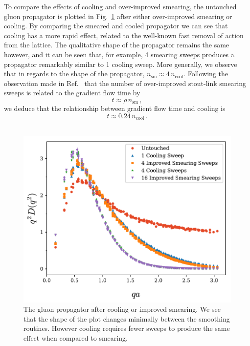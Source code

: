 To compare the effects of cooling and over-improved smearing, the untouched gluon propagator is plotted in Fig.~\ref{fig:SmearCoolComp} after either over-improved smearing or cooling. By comparing the smeared and cooled propagator we can see that cooling has a more rapid effect, related to the well-known fast removal of action from the lattice. The qualitative shape of the propagator remains the same however, and it can be seen that, for example, 4 smearing sweeps produces a propagator remarkably similar to 1 cooling sweep. More generally, we observe that in regards to the shape of the propagator, $n_{\text{sm}}\approx4\,n_{\text{cool}}$. Following the observation made in Ref.~\cite{Thomas:2014tda} that the number of over-improved stout-link smearing sweeps is related to the gradient flow time by
%
\begin{equation}
t\approx\rho\,n_{\text{sm}}\, ,
\end{equation}
%
we deduce that the relationship between gradient flow time and cooling is
\begin{equation}
t\approx0.24\,n_{\text{cool}}\,.
\end{equation}\\
%
\begin{figure}[tb]
\centering
\includegraphics[width=\linewidth]{./ScalarGluComp_q2_SmearCoolComp.pdf}
\caption[The gluon propagator after cooling or improved smearing.]{\label{fig:SmearCoolComp}The gluon propagator after cooling or improved smearing. We see that the shape of the plot changes minimally between the smoothing routines. However cooling requires fewer sweeps to produce the same effect when compared to smearing.}
\end{figure}
%

